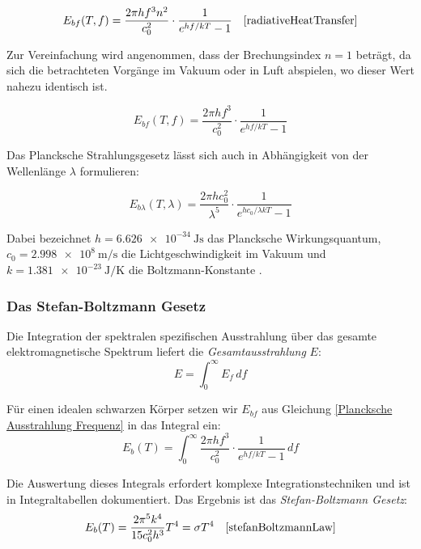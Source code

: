 \documentclass[12pt,a4paper]{article}
\begin{document}
\begin{equation}
  \label{Plancksche Ausstrahlung Frequenz mit Brechungsindex}
  E_{bf}(T, f) = \frac{2\pi h f^3 n^2}{c_0^2} \cdot \frac{1}{e^{hf/kT}-1} 
  \quad \text{\cite[S.8]{radiativeHeatTransfer}}
\end{equation}

Zur Vereinfachung wird angenommen, dass der Brechungsindex $n = 1$ beträgt, da sich die betrachteten Vorgänge im Vakuum oder in Luft abspielen, wo dieser Wert nahezu identisch ist.

\begin{equation}
  \label{Plancksche Ausstrahlung Frequenz}
  E_{bf}(T, f) = \frac{2\pi h f^3}{c_0^2} \cdot \frac{1}{e^{hf/kT}-1} 
\end{equation}


Das Plancksche Strahlungsgesetz lässt sich auch in Abhängigkeit von der Wellenlänge $\lambda$ formulieren:

\begin{equation}
  \label{Plancksche Ausstrahlung Wellenlänge}
  E_{b\lambda}(T, \lambda) = \frac{2\pi h c_0^2}{\lambda^5} \cdot \frac{1}{e^{hc_0/\lambda kT}-1}
\end{equation}

Dabei bezeichnet $h = \SI{6.626e-34}{\joule\second}$ das Plancksche Wirkungsquantum, 
$c_0 = \SI{2.998e8}{\meter\per\second}$ die Lichtgeschwindigkeit im Vakuum 
und $k = \SI{1.381e-23}{\joule\per\kelvin}$ die Boltzmann-Konstante \cite{codata2018}.

\subsubsection{Das Stefan-Boltzmann Gesetz}
Die Integration der spektralen spezifischen Ausstrahlung über das gesamte 
elektromagnetische Spektrum liefert die \textit{Gesamtausstrahlung} $E$:
\begin{equation}
  E = \int_{0}^{\infty}E_f \, df
\end{equation}
\cite{stefanBoltzmannLaw}

Für einen idealen schwarzen Körper setzen wir $E_{bf}$ aus Gleichung 
\eqref{Plancksche Ausstrahlung Frequenz} in das Integral ein:
\begin{equation*}
  E_b(T) = \int_{0}^{\infty} \frac{2\pi h f^3}{c_0^2} \cdot \frac{1}{e^{hf/kT}-1} \, df
\end{equation*}

Die Auswertung dieses Integrals erfordert komplexe Integrationstechniken und ist 
in Integraltabellen dokumentiert\cite[S.13]{radiativeHeatTransfer}. 
Das Ergebnis ist das \textit{Stefan-Boltzmann Gesetz}:
\begin{equation}
  E_b(T) = \frac{2\pi^5k^4}{15c_0^2h^3}T^4 = \sigma T^4 \quad \text{\cite{stefanBoltzmannLaw}}
\end{equation}
\end{document}
